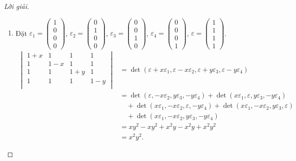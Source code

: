 \begin{proof}[Lời giải]
\begin{enumerate}[label = (\alph*)]
        \item Đặt $\varepsilon_{1} = \begin{pmatrix}1 \\ 0 \\ 0 \\ 0\end{pmatrix}$, $\varepsilon_{2} = \begin{pmatrix}0 \\ 1 \\ 0 \\ 0\end{pmatrix}$, $\varepsilon_{3} = \begin{pmatrix}0 \\ 0 \\ 1 \\ 0\end{pmatrix}$, $\varepsilon_{4} = \begin{pmatrix}0 \\ 0 \\ 0 \\ 1\end{pmatrix}$, $\varepsilon = \begin{pmatrix}1 \\ 1 \\ 1 \\ 1\end{pmatrix}$.
              \begin{align*}
                  \begin{vmatrix}
                      1 + x & 1     & 1     & 1     \\
                      1     & 1 - x & 1     & 1     \\
                      1     & 1     & 1 + y & 1     \\
                      1     & 1     & 1     & 1 - y \\
                  \end{vmatrix}
                   & = \det(\varepsilon + x\varepsilon_{1}, \varepsilon - x\varepsilon_{2}, \varepsilon + y\varepsilon_{3}, \varepsilon - y\varepsilon_{4})                       \\
                   & = \det(\varepsilon, -x\varepsilon_{2}, y\varepsilon_{3}, -y\varepsilon_{4}) + \det(x\varepsilon_{1}, \varepsilon, y\varepsilon_{3}, -y\varepsilon_{4})       \\
                   & \quad + \det(x\varepsilon_{1}, -x\varepsilon_{2}, \varepsilon, -y\varepsilon_{4}) + \det(x\varepsilon_{1}, -x\varepsilon_{2}, y\varepsilon_{3}, \varepsilon) \\
                   & \quad + \det(x\varepsilon_{1}, -x\varepsilon_{2}, y\varepsilon_{3}, -y\varepsilon_{4})                                                                       \\
                   & = xy^{2} - xy^{2} + x^{2}y - x^{2}y + x^{2}y^{2}                                                                                                             \\
                   & = x^{2}y^{2}.
              \end{align*}
    \end{enumerate}
\end{proof}

